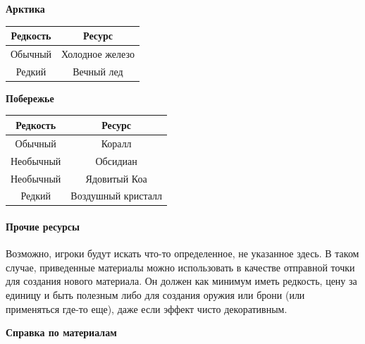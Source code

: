 \documentclass[a4paper, 9pt, twocolumn]{book}
\begin{document}
\begin{minipage}{0.45\linewidth}
		\medspace
		
		\textbf{Арктика}
		
		\begin{tabular}{|c|c|}
			\hline
			\textbf{Редкость} & \textbf{Ресурс} \\
			\hline
			Обычный & Холодное железо \\
			\hline
			Редкий & Вечный лед \\
			\hline
		\end{tabular}
	
		\medspace
		
		\textbf{Побережье}
		
		\begin{tabular}{|c|c|}
			\hline
			\textbf{Редкость} & \textbf{Ресурс} \\
			\hline
			Обычный & Коралл \\
			\hline
			Необычный & Обсидиан \\
			\hline
			Необычный & Ядовитый Коа \\
			\hline
			Редкий & Воздушный кристалл \\
			\hline
		\end{tabular}
	\end{minipage}
	
	\paragraph*{Прочие ресурсы}
	
	Возможно, игроки будут искать что-то определенное, не указанное здесь. В таком случае, приведенные материалы можно использовать в качестве отправной точки для создания нового материала. Он должен как минимум иметь редкость, цену за единицу и быть полезным либо для создания оружия или брони (или применяться где-то еще), даже если эффект чисто декоративным.
	
	\textbf{Справка по материалам}
	
\end{document}
